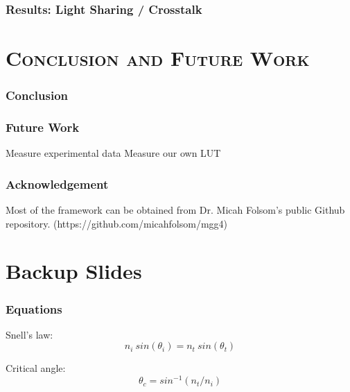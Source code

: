 \documentclass[xcolor=x11names, compress, handout]{beamer}
\renewcommand{\(}{\begin{columns}}
\renewcommand{\)}{\end{columns}}
\newcommand{\<}[1]{\begin{column}{#1}}
\renewcommand{\>}{\end{column}}
\begin{document}
\begin{frame}
\frametitle{Results: Light Sharing / Crosstalk }
\end{frame}

\section{\scshape Conclusion and Future Work}
\begin{frame}
\frametitle{Conclusion}
\end{frame}

\begin{frame}
\frametitle{Future Work}
Measure experimental data
Measure our own LUT 
\end{frame}

\begin{frame}
\frametitle{Acknowledgement}
Most of the framework can be obtained from Dr. Micah Folsom's public Github repository. (https://github.com/micahfolsom/mgg4)
\end{frame}


\appendix

\section{Backup Slides}
\begin{frame}
\frametitle{Equations}
Snell's law:
$$ n_i ~sin(\theta_i) = n_t ~sin(\theta_t) $$

Critical angle:
$$ \theta_c = sin^{-1}(n_t/n_i) $$
\end{frame}
\end{document}
